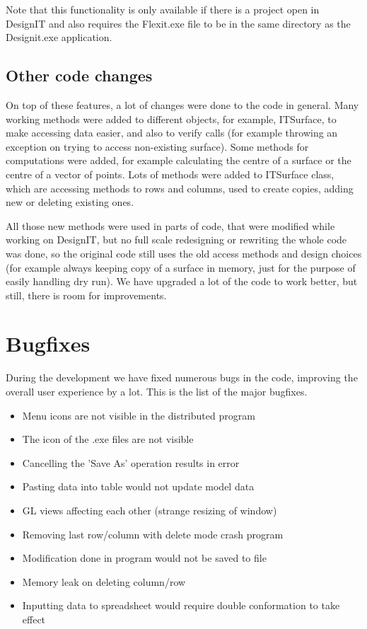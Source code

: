 \documentclass[a4paper, 11pt, article]{report}
\begin{document}
Note that this functionality is only available if there is a project open in DesignIT and also requires the Flexit.exe file to be in the same directory as the Designit.exe application.

\subsection{Other code changes}

On top of these features, a lot of changes were done to the code in general. Many working methods were added to different objects, for example, ITSurface, to make accessing data easier, and also to verify calls (for example throwing an exception on trying to access non-existing surface). Some methods for computations were added, for example calculating the centre of a surface or the centre of a vector of points. Lots of methods were added to ITSurface class, which are accessing methods to rows and columns, used to create copies, adding new or deleting existing ones. 

All those new methods were used in parts of code, that were modified while working on DesignIT, but no full scale redesigning or rewriting the whole code was done, so the original code still uses the old access methods and design choices (for example always keeping copy of a surface in memory, just for the purpose of easily handling dry run). We have upgraded a lot of the code to work better, but still, there is room for improvements.

\section{Bugfixes}

During the development we have fixed numerous bugs in the code, improving the overall user experience by a lot. This is the list of the major bugfixes.

\begin{itemize}
\item Menu icons are not visible in the distributed program
\item The icon of the .exe files are not visible
\item Cancelling the 'Save As' operation results in error
\item Pasting data into table would not update model data
\item GL views affecting each other (strange resizing of window)
\item Removing last row/column with delete mode crash program
\item Modification done in program would not be saved to file
\item Memory leak on deleting column/row
\item Inputting data to spreadsheet would require double conformation to take effect
\end{itemize}
\end{document}
